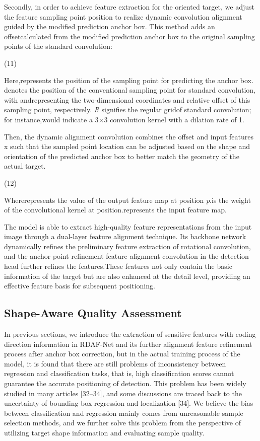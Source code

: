 \documentclass[10pt,twocolumn,final]{article}
\begin{document}
	Secondly, in order to achieve feature extraction for the oriented target, we adjust the feature sampling point position to realize dynamic convolution alignment guided by the modified prediction anchor box. This method adds an offsetcalculated from the modified prediction anchor box to the original sampling points of the standard convolution:

	(11)

Here,represents the position of the sampling point for predicting the anchor box. denotes the position of the conventional sampling point for standard convolution, with andrepresenting the two-dimensional coordinates and relative offset of this sampling point, respectively. \textit{R} signifies the regular gridof standard convolution; for instance,would indicate a 3×3 convolution kernel with a dilation rate of 1.

	Then, the dynamic alignment convolution combines the offset and input features x such that the sampled point location can be adjusted based on the shape and orientation of the predicted anchor box to better match the geometry of the actual target.

	(12)

Whererepresents the value of the output feature map at position \textit{p}.is the weight of the convolutional kernel at position.represents the input feature map.

The model is able to extract high-quality feature representations from the input image through a dual-layer feature alignment technique. Its backbone network dynamically refines the preliminary feature extraction of rotational convolution, and the anchor point refinement feature alignment convolution in the detection head further refines the features.These features not only contain the basic information of the target but are also enhanced at the detail level, providing an effective feature basis for subsequent positioning.

\subsection{ Shape-Aware Quality Assessment }

In previous sections, we introduce the extraction of sensitive features with coding direction information in RDAF-Net and its further alignment feature refinement process after anchor box correction, but in the actual training process of the model, it is found that there are still problems of inconsistency between regression and classification tasks, that is, high classification scores cannot guarantee the accurate positioning of detection. This problem has been widely studied in many articles [32–34], and some discussions are traced back to the uncertainty of bounding box regression and localization [34]. We believe the bias between classification and regression mainly comes from unreasonable sample selection methods, and we further solve this problem from the perspective of utilizing target shape information and evaluating sample quality.
\end{document}
